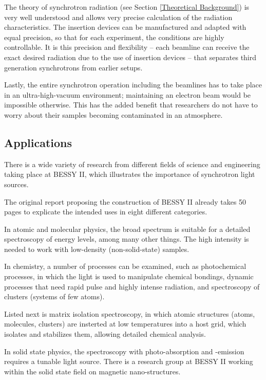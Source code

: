 \documentclass[a4paper,10pt]{article}
\begin{document}
    The theory of synchrotron radiation (see Section 
\ref{Theoretical Background}) is very well understood and allows very precise
calculation of the radiation characteristics. The insertion devices can be
manufactured and adapted with equal precision, so that for each experiment, the
conditions are highly controllable. It is this precision and flexibility -- each
beamline can receive the exact desired radiation due to the use of insertion
devices -- that separates third generation synchrotrons from earlier setups.

    Lastly, the entire synchrotron operation including the beamlines has to
take place in an ultra-high-vacuum environment; maintaining an electron beam
would be impossible otherwise. This has the added benefit that researchers do
not have to worry about their samples becoming contaminated in an atmosphere.

    \subsection{Applications}

    There is a wide variety of research from different fields of science and
engineering taking place at BESSY II, which illustrates the importance of
synchrotron light sources.

    The original report proposing the construction of BESSY II \citep{bessy}
already takes 50 pages to explicate the intended uses in eight different
categories. 

    In atomic and molecular physics, the broad spectrum is suitable for a
detailed spectroscopy of energy levels, among many other things. The high
intensity is needed to work with low-density (non-solid-state) samples. 

    In chemistry, a number of processes can be examined, such as photochemical
processes, in which the light is used to manipulate chemical bondings, dynamic
processes that need rapid pulse and highly intense radiation, and spectroscopy
of clusters (systems of few atoms). 

    Listed next is matrix isolation spectroscopy, in which atomic structures
(atoms, molecules, clusters) are insterted at low temperatures into a host
grid, which isolates and stabilizes them, allowing detailed chemical analysis.

    In solid state physics, the spectroscopy with photo-absorption and
-emission requires a tunable light source. There is a research group at BESSY II
working within the solid state field on magnetic nano-structures.
\end{document}
